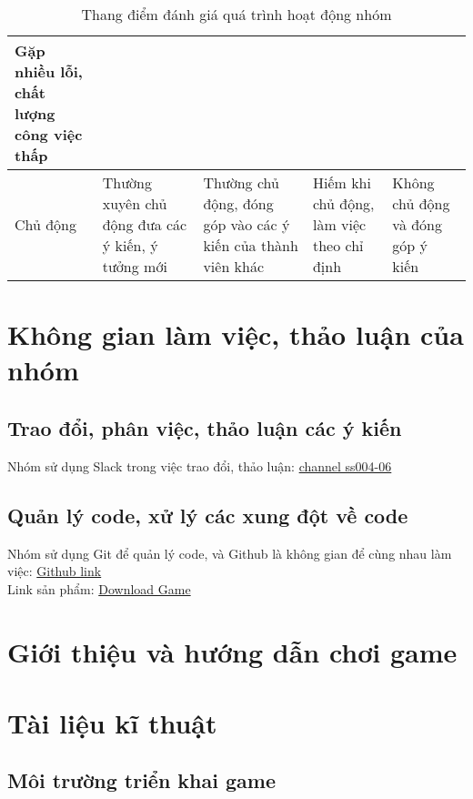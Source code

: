 \documentclass[12pt]{report}
\begin{document}
\begin{table}[H]
{\begin{tabularx}{\textwidth}{|p{60pt}|X|X|X|X|}
            Gặp nhiều lỗi, chất lượng công việc thấp                               \\
            \hline
            Chủ động                                                             &
            Thường xuyên chủ động đưa các ý kiến, ý tưởng mới                    &
            Thường chủ động, đóng góp vào các ý kiến của thành viên khác         &
            Hiếm khi chủ động, làm việc theo chỉ định                            &
            Không chủ động và đóng góp ý kiến                                      \\
            \hline
        \end{tabularx}
    }
    \caption{Thang điểm đánh giá quá trình hoạt động nhóm}
    \label{tab:teamwork_rubric}
\end{table}

\chapter{Không gian làm việc, thảo luận của nhóm}
\label{sec:work_space}

\section{Trao đổi, phân việc, thảo luận các ý kiến}
Nhóm sử dụng Slack trong việc trao đổi, thảo luận: \href{https://ss004e11cn1.slack.com/archives/C07T94K918U}{channel ss004-06}
\section{Quản lý code, xử lý các xung đột về code}
Nhóm sử dụng Git để quản lý code, và Github là không gian để cùng nhau làm việc: \href{https://github.com/ThinhNgo96/snake_game}{Github link} \\
Link sản phẩm: \href{https://github.com/ThinhNgo96/snake_game/releases}{Download Game}

\chapter{Giới thiệu và hướng dẫn chơi game}
\label{sec:game_tutorial}

\chapter{Tài liệu kĩ thuật}
\label{sec:technical_detail}
\section{Môi trường triển khai game}
\end{document}
